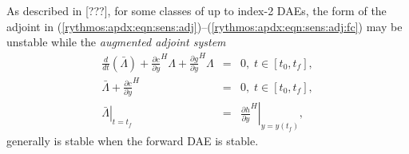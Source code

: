\documentclass[pdf,ps2pdf,11pt]{SANDreport}
\begin{document}
As described in [???], for some classes of up to index-2 DAEs, the form of the
adjoint in
(\ref{rythmos:apdx:eqn:sens:adj})--(\ref{rythmos:apdx:eqn:sens:adj:fc}) may be
unstable while the {}\textit{augmented adjoint system}
%
\begin{eqnarray}
\frac{d}{dt}\left( \bar{\Lambda} \right)
+  \frac{\partial c}{\partial y}^H \Lambda + \frac{\partial g}{\partial y}^H \Lambda
& = & 0, \; t \in \left[ t_0, t_f \right],
\label{rythmos:apdx:eqn:sens:aug-adj-de} \\
\bar{\Lambda} + \frac{\partial c}{\partial \dot{y}}^H
& = & 0, \; t \in \left[ t_0, t_f \right],
\label{rythmos:apdx:eqn:sens:aug-adj-ae} \\
\left. \bar{\Lambda} \right|_{t=t_f}
& = & \left. \frac{\partial h}{\partial y}^H \right|_{y=y(t_f)},
\label{rythmos:apdx:eqn:sens:aug-adj:fc}
\end{eqnarray}
%
generally is stable when the forward DAE is stable.

\begin{SANDdistribution}
\end{SANDdistribution}
\end{document}
